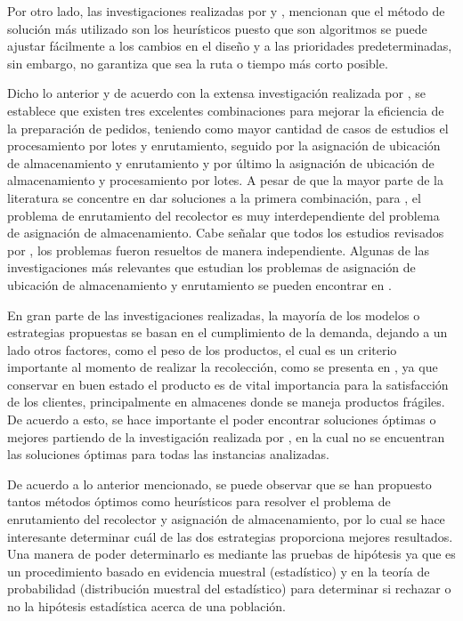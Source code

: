 \documentclass[preprint,12pt, pdftex]{elsarticle}
\begin{document}
Por otro lado, las investigaciones realizadas por \citet{DeKoster2007} y \citet{Bahrami2017}, mencionan que el  método de solución más utilizado son los heurísticos puesto que son algoritmos se puede ajustar fácilmente a los cambios en el diseño y a las prioridades predeterminadas, sin embargo, no garantiza que sea la ruta o tiempo más corto posible.

Dicho lo anterior y de acuerdo con la extensa investigación realizada por \citet{VanGils2018}, se establece que existen tres excelentes combinaciones para mejorar la eficiencia de la preparación de pedidos, teniendo como mayor cantidad de casos de estudios el procesamiento por lotes y enrutamiento, seguido por la asignación de ubicación de almacenamiento y enrutamiento y por último la asignación de ubicación de almacenamiento y procesamiento por lotes. A pesar de que la mayor parte de la literatura se concentre en dar soluciones a la primera combinación, para \citet{Bartholdi2014}, el problema de enrutamiento del recolector es muy interdependiente del problema de asignación de almacenamiento. Cabe señalar que todos los estudios revisados por \citet{VanGils2018}, los problemas fueron resueltos de manera independiente. Algunas de las investigaciones más relevantes que estudian los problemas de asignación de ubicación de almacenamiento y enrutamiento se pueden encontrar en \citet{Dekker2004, Zulj2018, Chabot2017, Matusiak2014, Daniels1998, Bolanos2020}. 

En gran parte de las investigaciones realizadas, la mayoría de los modelos o estrategias propuestas se basan en el cumplimiento de la demanda, dejando a un lado otros factores, como el peso de los productos, el cual es un criterio importante al momento de realizar la recolección, como se presenta en \citet{Dekker2004, Zulj2018, Chabot2017}, ya que conservar en buen estado el producto es de vital importancia para la satisfacción de los clientes, principalmente en almacenes donde se maneja productos frágiles. De acuerdo a esto, se hace importante el poder encontrar soluciones óptimas o mejores partiendo de la investigación realizada por \citet{Bolanos2020}, en la cual no se encuentran las soluciones óptimas para todas las instancias analizadas.

De acuerdo a lo anterior mencionado, se puede observar que se han propuesto tantos métodos óptimos como heurísticos para resolver el problema de enrutamiento del recolector y asignación de almacenamiento, por lo cual se hace interesante determinar cuál de las dos estrategias proporciona mejores resultados. Una manera de poder determinarlo es mediante las pruebas de hipótesis ya que es un procedimiento basado en evidencia muestral (estadístico) y en la teoría de probabilidad (distribución muestral del estadístico) para determinar si rechazar o no la hipótesis estadística acerca de una población. 
\end{document}
